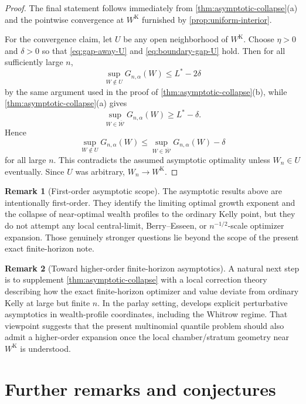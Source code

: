 \documentclass[11pt]{article}
\theoremstyle{definition}
\newtheorem{remark}[remark]{Remark}
\newcommand{\1}{\mathbf{1}}
\begin{document}
\begin{proof}
The final statement follows immediately from \cref{thm:asymptotic-collapse}(a) and the pointwise convergence at $W^{\mathrm K}$ furnished by \cref{prop:uniform-interior}.

For the convergence claim, let $U$ be any open neighborhood of $W^{\mathrm K}$. Choose $\eta>0$ and $\delta>0$ so that \eqref{eq:gap-away-U} and \eqref{eq:boundary-gap-U} hold. Then for all sufficiently large $n$,
\[
\sup_{W\notin U} G_{n,\alpha}(W)\le L^*-2\delta
\]
by the same argument used in the proof of \cref{thm:asymptotic-collapse}(b), while \cref{thm:asymptotic-collapse}(a) gives
\[
\sup_{W\in\overline{\mathcal W}} G_{n,\alpha}(W)\ge L^*-\delta.
\]
Hence
\[
\sup_{W\notin U} G_{n,\alpha}(W)
\le \sup_{W\in\overline{\mathcal W}} G_{n,\alpha}(W)-\delta
\]
for all large $n$. This contradicts the assumed asymptotic optimality unless $W_n\in U$ eventually. Since $U$ was arbitrary, $W_n\to W^{\mathrm K}$.

\end{proof}

\begin{remark}[First-order asymptotic scope]
The asymptotic results above are intentionally first-order. They identify the limiting optimal growth exponent and the collapse of near-optimal wealth profiles to the ordinary Kelly point, but they do not attempt any local central-limit, Berry--Esseen, or $n^{-1/2}$-scale optimizer expansion. Those genuinely stronger questions lie beyond the scope of the present exact finite-horizon note.
\end{remark}

\begin{remark}[Toward higher-order finite-horizon asymptotics]
A natural next step is to supplement \cref{thm:asymptotic-collapse} with a local correction theory describing how the exact finite-horizon optimizer and value deviate from ordinary Kelly at large but finite $n$. In the parlay setting, \cite{Long2026Parlay} develops explicit perturbative asymptotics in wealth-profile coordinates, including the Whitrow regime. That viewpoint suggests that the present multinomial quantile problem should also admit a higher-order expansion once the local chamber/stratum geometry near $W^{\mathrm K}$ is understood.
\end{remark}

\section{Further remarks and conjectures}
\end{document}
